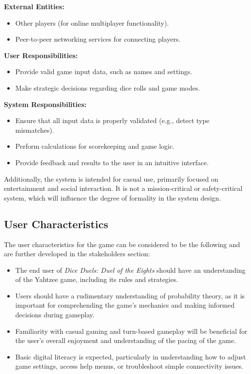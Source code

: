   \noindent\textbf{External Entities:}
  \begin{itemize}
      \item Other players (for online multiplayer functionality).
      \item Peer-to-peer networking services for connecting players.
  \end{itemize}

  \noindent\textbf{User Responsibilities:}
\begin{itemize}
    \item Provide valid game input data, such as names and settings.
    \item Make strategic decisions regarding dice rolls and game modes.
\end{itemize}

\noindent\textbf{System Responsibilities:}
\begin{itemize}
    \item Ensure that all input data is properly validated (e.g., detect type mismatches).
    \item Perform calculations for scorekeeping and game logic.
    \item Provide feedback and results to the user in an intuitive interface.
\end{itemize}

\noindent Additionally, the system is intended for casual use, primarily focused on entertainment and social interaction. It is not a mission-critical or safety-critical system, which will influence the degree of formality in the system design.

\subsection{User Characteristics} \label{SecUserCharacteristics}

The user characteristics for the game can be considered to be the following and are further developed in the stakeholders section:
  
\begin{itemize}
    \item The end user of \textit{Dice Duels: Duel of the Eights} should have an understanding of the Yahtzee game, including its rules and strategies.
    \item Users should have a rudimentary understanding of probability theory, as it is important for comprehending the game's mechanics and making informed decisions during gameplay.
    \item Familiarity with casual gaming and turn-based gameplay will be beneficial for the user's overall enjoyment and understanding of the pacing of the game.
    \item Basic digital literacy is expected, particularly in understanding how to adjust game settings, access help menus, or troubleshoot simple connectivity issues.
\end{itemize}

